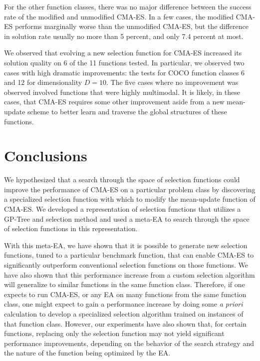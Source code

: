 \documentclass[sigconf]{acmart}
\begin{document}
For the other function classes, there was no major difference between the success rate of the modified and unmodified CMA-ES. In a few cases, the modified CMA-ES performs marginally worse than the unmodified CMA-ES, but the difference in solution rate usually no more than 5 percent, and only 7.4 percent at most.

We observed that evolving a new selection function for CMA-ES increased its solution quality on 6 of the 11 functions tested. In particular, we observed two cases with high dramatic improvements: the tests for COCO function classes 6 and 12 for dimensionality $D=10$. The five cases where no improvement was observed involved functions that were highly multimodal. It is likely, in these cases, that CMA-ES requires some other improvement aside from a new mean-update scheme to better learn and traverse the global structures of these functions. 

\section{Conclusions}
\label{Conclusion}
We hypothesized that a search through the space of selection functions could improve the performance of CMA-ES on a particular problem class by discovering a specialized selection function with which to modify the mean-update function of CMA-ES. We developed a representation of selection functions that utilizes a GP-Tree and selection method and used a meta-EA to search through the space of selection functions in this representation.

With this meta-EA, we have shown that it is possible to generate new selection functions, tuned to a particular benchmark function, that can enable CMA-ES to significantly outperform conventional selection functions on those functions. We have also shown that this performance increase from a custom selection algorithm will generalize to similar functions in the same function class. Therefore, if one expects to run CMA-ES, or any EA on many functions from the same function class, one might expect to gain a performance increase by doing some \textit{a priori} calculation to develop a specialized selection algorithm trained on instances of that function class. However, our experiments have also shown that, for certain functions, replacing only the selection function may not yield significant performance improvements, depending on the behavior of the search strategy and the nature of the function being optimized by the EA. 
\end{document}

